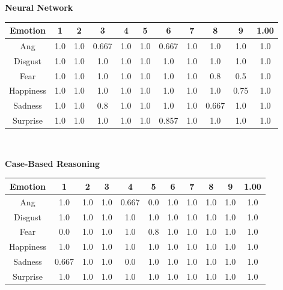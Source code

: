 \documentclass[a4paper]{article}
\begin{document}
 {\bf Neural Network}\\

\begin{center}
  \begin{tabular}{|c|cccccccccc|}
  \hline
    Emotion & 1 & 2 & 3 & 4 & 5 & 6 & 7 & 8 & 9 & 1.00 \\
    \hline
    Ang & 1.0 & 1.0 & 0.667 & 1.0 & 1.0 & 0.667 & 1.0 & 1.0 & 1.0 & 1.0 \\
Disgust & 1.0 & 1.0 & 1.0 & 1.0 & 1.0 & 1.0 & 1.0 & 1.0 & 1.0 & 1.0 \\
Fear & 1.0 & 1.0 & 1.0 & 1.0 & 1.0 & 1.0 & 1.0 & 0.8 & 0.5 & 1.0 \\
Happiness & 1.0 & 1.0 & 1.0 & 1.0 & 1.0 & 1.0 & 1.0 & 1.0 & 0.75 & 1.0 \\
Sadness & 1.0 & 1.0 & 0.8 & 1.0 & 1.0 & 1.0 & 1.0 & 0.667 & 1.0 & 1.0 \\
Surprise & 1.0 & 1.0 & 1.0 & 1.0 & 1.0 & 0.857 & 1.0 & 1.0 & 1.0 & 1.0 \\
	\hline
  \end{tabular}\\
  \end{center} 
  
 {\bf Case-Based Reasoning}\\

\begin{center}
  \begin{tabular}{|c|cccccccccc|}
  \hline
    Emotion & 1 & 2 & 3 & 4 & 5 & 6 & 7 & 8 & 9 & 1.00 \\
    \hline
    Ang & 1.0 & 1.0 & 1.0 & 0.667 &0.0& 1.0 & 1.0 & 1.0 & 1.0 & 1.0 \\
Disgust & 1.0 & 1.0 & 1.0 & 1.0 & 1.0 & 1.0 & 1.0 & 1.0 & 1.0 & 1.0 \\
Fear 	&0.0& 1.0 & 1.0 & 1.0 & 0.8 & 1.0 & 1.0 & 1.0 & 1.0 & 1.0 \\
Happiness & 1.0 & 1.0 & 1.0 & 1.0 & 1.0 & 1.0 & 1.0 & 1.0 & 1.0 & 1.0 \\
Sadness & 0.667 & 1.0 & 1.0 &0.0& 1.0 & 1.0 & 1.0 & 1.0 & 1.0 & 1.0 \\
Surprise & 1.0 & 1.0 & 1.0 & 1.0 & 1.0 & 1.0 & 1.0 & 1.0 & 1.0 & 1.0 \\
	\hline
  \end{tabular}\\
  \end{center} 
 
\end{document}
